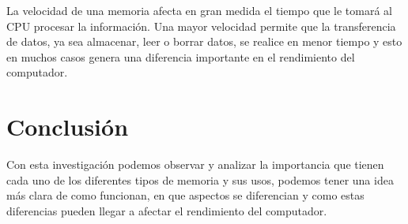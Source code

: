 \documentclass{article}
\begin{document}
La velocidad de una memoria afecta en gran medida el tiempo que le tomará al CPU procesar la información. Una mayor velocidad permite que la transferencia de datos, ya sea almacenar, leer o borrar datos, se realice en menor tiempo y esto en muchos casos genera una diferencia importante en el rendimiento del computador.

\section{Conclusión}
Con esta investigación podemos observar y analizar la importancia que tienen cada uno de los diferentes tipos de memoria y sus usos, podemos tener una idea más clara de como funcionan, en que aspectos se diferencian y como estas diferencias pueden llegar a afectar el rendimiento del computador.

\vspace{5mm}





\nocite{*}
\end{document}
